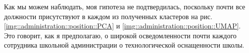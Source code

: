 Как мы можем наблюдать, моя гипотеза не подтвердилась, поскольку почти все должности присутствуют в каждом из полученных кластеров на рис. \ref{img::administration::position::PCA} и \ref{img::administration::position::UMAP}.
Это говорит, как я предполагаю, о широкой осведомленности почти каждого сотрудника школьной администрации о технологической оснащенности школы.



